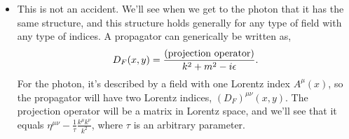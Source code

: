 \documentclass[12pt, oneside]{article}   	%
\theoremstyle{definition}
\begin{document}
\begin{itemize}
	\item This is not an accident. We'll see when we get to the photon that it has the same structure, and this structure holds generally for any type of field with any type of indices. A propagator can generically be written as,
	\begin{equation}
		D_F(x, y) = \frac{(\textnormal{projection operator})}{k^2 + m^2 - i\epsilon}.
	\end{equation}
	For the photon, it's described by a field with one Lorentz index $A^\mu(x)$, so the propagator will have two Lorentz indices, $(D_F)^{\mu\nu}(x, y)$. The projection operator will be a matrix in Lorentz space, and we'll see that it equals $\eta^{\mu\nu} - \frac{1}{\tau} \frac{k^\mu k^\nu}{k^2}$, where $\tau$ is an arbitrary parameter. 

\end{itemize}

\end{document}
